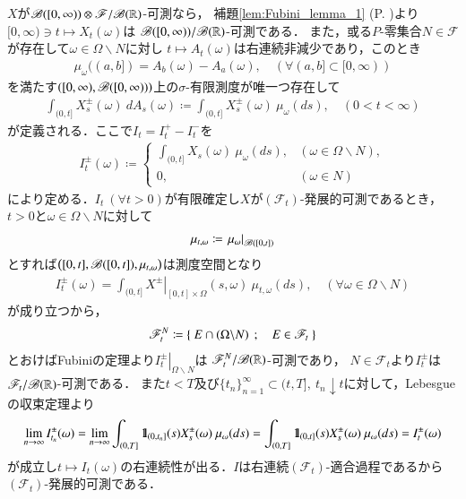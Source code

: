 	\begin{prf}
		$X$が$\mathscr{B}([0,\infty)) \otimes \mathscr{F}/\mathscr{B}(\mathbb{R})$-可測なら，
		補題\ref{lem:Fubini_lemma_1} (P. \pageref{lem:Fubini_lemma_1})より
		$[0,\infty) \ni t \longmapsto X_t(\omega)$は
		$\mathscr{B}([0,\infty))/\mathscr{B}(\mathbb{R})$-可測である．
		また，或る$P$-零集合$N \in \mathscr{F}$が存在して$\omega \in \Omega \backslash N$に対し
		$t \longmapsto A_t(\omega)$は右連続非減少であり，このとき
		\begin{align}
			\mu_\omega((a,b]) = A_b(\omega) - A_a(\omega),
			\quad (\forall (a,b] \subset [0,\infty))
		\end{align}
		を満たす$\left([0,\infty),\mathscr{B}([0,\infty))\right)$上の$\sigma$-有限測度が唯一つ存在して
		\begin{align}
			\int_{(0,t]} X^\pm_s(\omega)\ dA_s(\omega)
			\coloneqq \int_{(0,t]} X^\pm_s(\omega)\ \mu_\omega(ds),
			\quad (0 < t < \infty)
		\end{align}
		が定義される．ここで$I_t = I^+_t - I^-_t$を
		\begin{align}
			I^\pm_t(\omega) \coloneqq
			\begin{cases}
				\displaystyle\int_{(0,t]} X_s(\omega)\ \mu_\omega(ds), & (\omega \in \Omega \backslash N), \\
				0, & (\omega \in N)
			\end{cases}
		\end{align}
		により定める．$I_t\ (\forall t > 0)$が有限確定し$X$が$(\mathscr{F}_t)$-発展的可測であるとき，
		$t>0$と$\omega \in \Omega \backslash N$に対して
		\begin{align}
			\mu_{t,\omega} \coloneqq \left.\mu_\omega\right|_{\mathscr{B}([0,t])}
		\end{align}
		とすれば$\left([0,t],\mathscr{B}([0,t]),\mu_{t,\omega}\right)$は測度空間となり
		\begin{align}
			I^{\pm}_t(\omega) =
			\int_{(0,t]} \left.X^\pm\right|_{[0,t] \times \Omega}(s,\omega)\ \mu_{t,\omega}(ds),
			\quad (\forall \omega \in \Omega \backslash N)
		\end{align}
		が成り立つから，
		\begin{align}
			\mathscr{F}^N_t \coloneqq \left\{\ E \cap (\Omega \backslash N)\ \, ; \quad E \in \mathscr{F}_t\ \right\}
		\end{align}
		とおけばFubiniの定理より$\left.I^\pm_t\right|_{\Omega \backslash N}$は
		$\mathscr{F}^N_t/\mathscr{B}(\mathbb{R})$-可測であり，
		$N \in \mathscr{F}_t$より$I^\pm_t$は$\mathscr{F}_t/\mathscr{B}(\mathbb{R})$-可測である．
		また$t<T$及び$\{t_n\}_{n=1}^\infty \subset (t,T],\ t_n \downarrow t$に対して，Lebesgueの収束定理より
		\begin{align}
			\lim_{n \to \infty} I^\pm_{t_n}(\omega)
			= \lim_{n \to \infty} \int_{(0,T]} \defunc_{(0,t_n]}(s)X^\pm_s(\omega)\ \mu_\omega(ds)
			= \int_{(0,T]} \defunc_{(0,t]}(s)X^\pm_s(\omega)\ \mu_\omega(ds)
			= I^\pm_t(\omega)
		\end{align}
		が成立し$t \longmapsto I_t(\omega)$の右連続性が出る．$I$は右連続$(\mathscr{F}_t)$-適合過程であるから
		$(\mathscr{F}_t)$-発展的可測である．
		\QED
	\end{prf}
	
